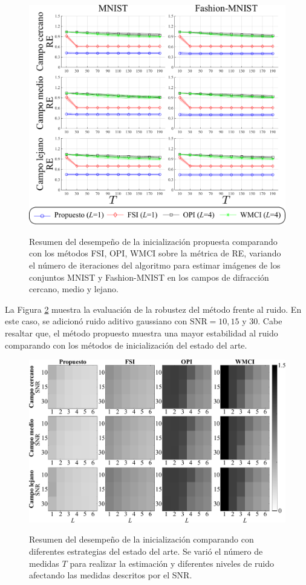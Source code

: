 \begin{figure}[!h]
\centering
    \caption{Resumen del desempeño de la inicialización propuesta comparando con los métodos FSI, OPI, WMCI sobre la métrica de RE, variando el número de iteraciones del algoritmo para estimar imágenes de los conjuntos MNIST y Fashion-MNIST en los campos de difracción cercano, medio y lejano.}
    \includegraphics[width=0.85\linewidth]{images/resultados/results_initializations.pdf}
        \label{fig:results_initializations}
\end{figure}



La Figura \ref{fig:noisy_scenario} muestra la evaluación de la robustez del método frente al ruido. En este caso, se adicionó ruido aditivo gaussiano con $\mathrm{SNR} = 10, 15$ y $30$. Cabe resaltar que, el método propuesto muestra una mayor estabilidad al ruido comparando con los métodos de inicialización del estado del arte.

\begin{figure}[!h]
    \caption{Resumen del desempeño de la inicialización comparando con diferentes estrategias del estado del arte. Se varió el número de medidas $T$ para realizar la estimación y diferentes niveles de ruido afectando las medidas descritos por el SNR.}
    \includegraphics[width=1\linewidth]{images/resultados/Noisy_Initializations.pdf}
    \label{fig:noisy_scenario}
\end{figure}

